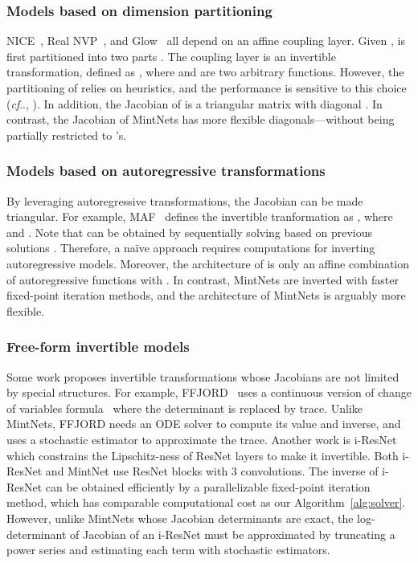 \documentclass{article}
\makeatletter
\def\@onedot{\ifx\@let@token.\else.\null\fi\xspace}
\DeclareRobustCommand\onedot{\futurelet\@let@token\@onedot}
\newcommand{\algoref}[1]{Algorithm~\ref{#1}}
\def\cf{\emph{cf}\onedot}
\makeatother
\begin{document}
\subsubsection{Models based on dimension partitioning} NICE~\cite{dinh2016density}, Real NVP~\cite{nvp}, and Glow~\cite{glow} all depend on an affine coupling layer. Given ,  is first partitioned into two parts . The coupling layer is an invertible transformation, defined as , where  and  are two arbitrary functions. However, the partitioning of  relies on heuristics, and the performance is sensitive to this choice (\cf, \cite{glow,i-resnet}). In addition, the Jacobian of  is a triangular matrix with diagonal . In contrast, the Jacobian of MintNets has more flexible diagonals---without being partially restricted to 's.

\subsubsection{Models based on autoregressive transformations} By leveraging autoregressive transformations, the Jacobian can be made triangular. For example, MAF~\cite{maf} defines the invertible tranformation as , where  and . Note that  can be obtained by sequentially solving  based on previous solutions . Therefore, a na\"{i}ve approach requires  computations for inverting autoregressive models. Moreover, the architecture of  is only an affine combination of autoregressive functions with . In contrast, MintNets are inverted with faster fixed-point iteration methods, and the architecture of MintNets is arguably more flexible.

\subsubsection{Free-form invertible models} Some work proposes invertible transformations whose Jacobians are not limited by special structures. For example, FFJORD~\cite{FFJORD} uses a continuous version of change of variables formula~\cite{chen2018neural} where the determinant is replaced by trace. Unlike MintNets, FFJORD needs an ODE solver to compute its value and inverse, and uses a stochastic estimator to approximate the trace. Another work is i-ResNet~\cite{i-resnet} which constrains the Lipschitz-ness of ResNet layers to make it invertible. Both i-ResNet and MintNet use ResNet blocks with 3 convolutions. The inverse of i-ResNet can be obtained efficiently by a parallelizable fixed-point iteration method, which has comparable computational cost as our \algoref{alg:solver}. However, unlike MintNets whose Jacobian determinants are exact, the log-determinant of Jacobian of an i-ResNet must be approximated by truncating a power series and estimating each term with stochastic estimators. 
\end{document}
